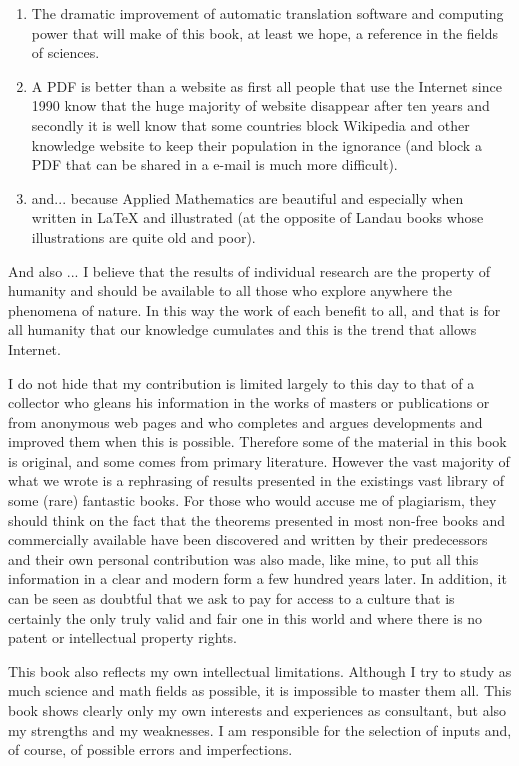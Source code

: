 \begin{enumerate}
		\item The dramatic improvement of automatic translation software and computing power that will make of this book, at least we hope, a reference in the fields of sciences.
		
		\item A PDF is better than a website as first all people that use the Internet since 1990 know that the huge majority of website disappear after ten years and secondly it is well know that some countries block Wikipedia and other knowledge website to keep their population in the ignorance (and block a PDF that can be shared in a e-mail is much more difficult).
		
		\item and... because Applied Mathematics are beautiful and especially when written in \LaTeX{} and illustrated (at the opposite of Landau books whose illustrations are quite old and poor).
\end{enumerate}

	And also ... I believe that the results of individual research are the property of humanity and should be available to all those who explore anywhere the phenomena of nature. In this way the work of each benefit to all, and that is for all humanity that our knowledge cumulates and this is the trend that allows Internet.

	I do not hide that my contribution is limited largely to this day to that of a collector who gleans his information in the works of masters or publications or from anonymous web pages and who completes and argues developments and improved them when this is possible. Therefore some of the material in this book is original, and some comes from primary literature. However the vast majority of what we wrote is a rephrasing of results presented in the existings vast library of some (rare) fantastic books. For those who would accuse me of plagiarism, they should think on the fact that the theorems presented in most non-free books and commercially available have been discovered and written by their predecessors and their own personal contribution was also made, like mine, to put all this information in a clear and modern form a few hundred years later. In addition, it can be seen as doubtful that we ask to pay for access to a culture that is certainly the only truly valid and fair one in this world and where there is no patent or intellectual property rights.

	This book also reflects my own intellectual limitations. Although I try to study as much science and math fields as possible, it is impossible to master them all. This book shows clearly only my own interests and experiences as consultant, but also my strengths and my weaknesses. I am responsible for the selection of inputs and, of course, of possible errors and imperfections.

